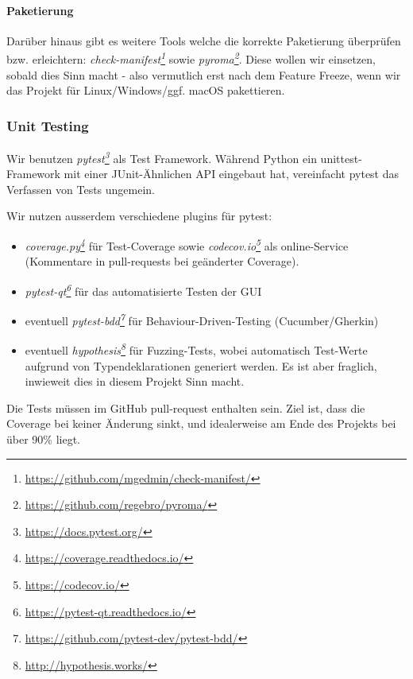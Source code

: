 \documentclass[a4paper]{article}
\begin{document}
\paragraph{Paketierung} Darüber hinaus gibt es weitere Tools welche die
korrekte Paketierung überprüfen bzw. erleichtern:
\emph{check-manifest\footnote{\url{https://github.com/mgedmin/check-manifest/}}}
sowie \emph{pyroma\footnote{\url{https://github.com/regebro/pyroma/}}}. Diese
wollen wir einsetzen, sobald dies Sinn macht - also vermutlich erst nach dem
Feature Freeze, wenn wir das Projekt für Linux/Windows/ggf. macOS pakettieren.

\subsubsection{Unit Testing}

Wir benutzen \emph{pytest\footnote{\url{https://docs.pytest.org/}}} als Test
Framework. Während Python ein unittest-Framework mit einer JUnit-Ähnlichen API
eingebaut hat, vereinfacht pytest das Verfassen von Tests ungemein.

Wir nutzen ausserdem verschiedene plugins für pytest:

\begin{itemize}
\item \emph{coverage.py\footnote{\url{https://coverage.readthedocs.io/}}} für
    Test-Coverage sowie \emph{codecov.io\footnote{\url{https://codecov.io/}}}
    als online-Service (Kommentare in pull-requests bei geänderter Coverage).
\item \emph{pytest-qt\footnote{\url{https://pytest-qt.readthedocs.io/}}} für das
    automatisierte Testen der GUI
\item eventuell \emph{pytest-bdd\footnote{\url{https://github.com/pytest-dev/pytest-bdd/}}} für Behaviour-Driven-Testing (Cucumber/Gherkin)
\item eventuell \emph{hypothesis\footnote{\url{http://hypothesis.works/}}} für
  Fuzzing-Tests, wobei automatisch Test-Werte aufgrund von Typendeklarationen
  generiert werden. Es ist aber fraglich, inwieweit dies in diesem Projekt Sinn macht.
\end{itemize}

Die Tests müssen im GitHub pull-request enthalten sein. Ziel ist, dass die
Coverage bei keiner Änderung sinkt, und idealerweise am Ende des Projekts bei
über 90\% liegt.
\end{document}
